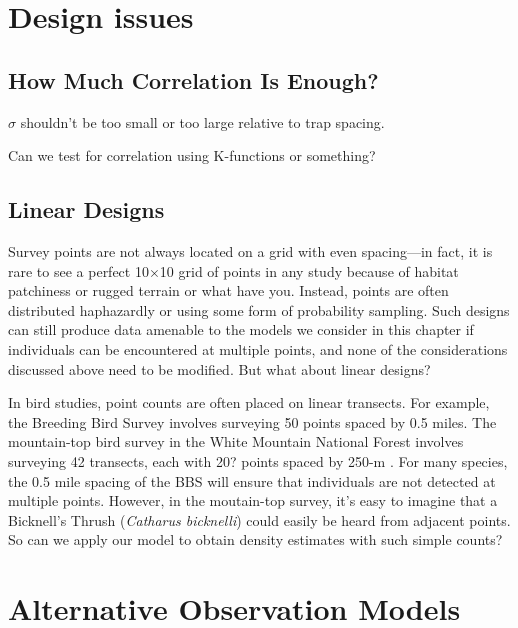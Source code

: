 \section{Design issues}

\subsection{How Much Correlation Is Enough?}

$\sigma$ shouldn't be too small or too large relative to trap spacing.

Can we test for correlation using K-functions or something?

\subsection{Linear Designs}

Survey points are not always located on a grid with even spacing---in
fact, it is rare to see a perfect 10$\times$10 grid of points in any
study because of habitat patchiness or rugged terrain or what have
you. Instead, points are often distributed haphazardly or using some form of
probability sampling. Such designs can still produce data amenable to
the models we consider in this chapter if individuals can be
encountered at multiple points, and none of the considerations
discussed above need to be modified. But what about linear designs?

In bird studies, point counts are often placed on linear transects. For
example, the Breeding Bird Survey involves surveying 50 points spaced
by 0.5 miles. The mountain-top bird survey in the White Mountain
National Forest involves surveying 42 transects, each with 20? points
spaced by 250-m \citep{king_etal:2008}. For many species, the 0.5 mile
spacing of the BBS will ensure that individuals are not detected at
multiple points. However, in the moutain-top survey, it's easy to
imagine that a Bicknell's Thrush (\emph{Catharus bicknelli}) could
easily be heard from adjacent points. So can we apply our model to
obtain density estimates with such simple counts?








\section{Alternative Observation Models}
\label{Sect.alt-obsmods}

